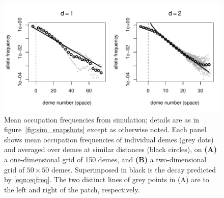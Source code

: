\documentclass{article}
\begin{document}
\begin{figure}[ht!]
  \begin{center}
    \includegraphics{sim-occupation-freqs}
  \end{center}
  \label{fig:sim_occupation_freqs}
  \caption{
  Mean occupation frequencies from simulation; details are as in figure~\ref{fig:sim_snapshots} except as otherwise noted.
  Each panel shows mean occupation frequencies of individual demes (grey dots)
  and averaged over demes at similar distances (black circles), on
  \textbf{(A)} a one-dimensional grid of 150 demes, and
  \textbf{(B)} a two-dimensional grid of $50\times 50$ demes.
  Superimposed in black is the decay predicted by \eqref{eqn:eqfreq}.
  The two distinct lines of grey points in (A) are to the left and right of the patch, respectively.
  }
\end{figure}
\end{document}
